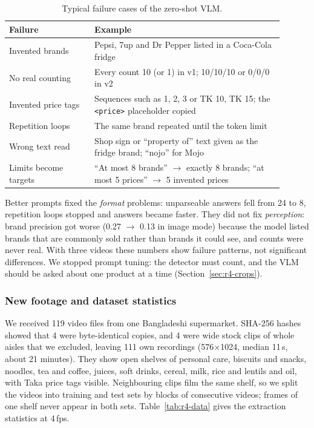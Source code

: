 \begin{table}[!t]
\centering
\caption{Typical failure cases of the zero-shot VLM.}
\label{tab:r4-failures}
\begin{tabular}{p{0.28\linewidth}p{0.62\linewidth}}
\hline
Failure & Example \\
\hline
Invented brands & Pepsi, 7up and Dr Pepper listed in a Coca-Cola fridge \\
No real counting & Every count 10 (or 1) in v1; 10/10/10 or 0/0/0 in v2 \\
Invented price tags & Sequences such as 1, 2, 3 or TK 10, TK 15; the \texttt{<price>} placeholder copied \\
Repetition loops & The same brand repeated until the token limit \\
Wrong text read & Shop sign or ``property of'' text given as the fridge brand; ``nojo'' for Mojo \\
Limits become targets & ``At most 8 brands'' $\rightarrow$ exactly 8 brands; ``at most 5 prices'' $\rightarrow$ 5 invented prices \\
\hline
\end{tabular}
\end{table}

Better prompts fixed the \emph{format} problems: unparseable answers fell from 24 to 8, repetition
loops stopped and answers became faster. They did not fix \emph{perception}: brand precision got
worse (0.27 $\rightarrow$ 0.13 in image mode) because the model listed brands that are commonly sold
rather than brands it could see, and counts were never real. With three videos these numbers show
failure patterns, not significant differences. We stopped prompt tuning: the detector must count,
and the VLM should be asked about one product at a time (Section~\ref{sec:r4-crops}).

\subsubsection{New footage and dataset statistics}\label{sec:r4-data}
We received 119 video files from one Bangladeshi supermarket. SHA-256 hashes showed that 4 were
byte-identical copies, and 4 were wide stock clips of whole aisles that we excluded, leaving 111 own
recordings (576$\times$1024, median 11\,s, about 21 minutes). They show open shelves of personal
care, biscuits and snacks, noodles, tea and coffee, juices, soft drinks, cereal, milk, rice and
lentils and oil, with Taka price tags visible. Neighbouring clips film the same shelf, so we split
the videos into training and test sets by blocks of consecutive videos; frames of one shelf never
appear in both sets. Table~\ref{tab:r4-data} gives the extraction statistics at 4\,fps.

